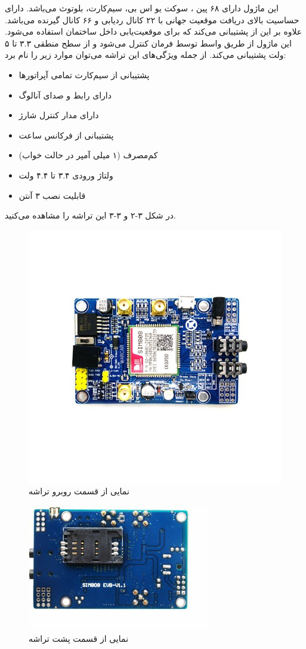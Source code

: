  
 این ماژول دارای ۶۸ پین ، سوکت یو اس بی، سیم‌کارت، بلوتوث می‌باشد. دارای حساسیت بالای دریافت موقعیت جهانی با ۲۲ کانال ردیابی و ۶۶ کانال گیرنده می‌باشد. علاوه بر این از  پشتیبانی می‌کند که برای موقعیت‌یابی داخل ساختمان استفاده می‌شود. این ماژول از طریق واسط  توسط فرمان  کنترل می‌شود و از سطح منطقی ۳.۳ تا ۵ ولت پشتیبانی می‌کند.
 از جمله ویژگی‌های این تراشه می‌توان موارد زیر را نام برد:
\begin{itemize}
	\item 
	پشتیبانی از سیم‌کارت تمامی آپراتورها
	\item
	دارای رابط  و صدای آنالوگ
	\item
	دارای مدار کنترل شارژ
	\item
	پشتیبانی از فرکانس ساعت
	\item
	کم‌مصرف (۱ میلی آمپر در حالت خواب)
	\item 
	ولتاژ ورودی ۳.۴ تا ۴.۴ ولت
	\item 
	قابلیت نصب ۳ آنتن 
\end{itemize} 
در شکل ۳-۲ و ۳-۳ این تراشه را مشاهده می‌کنید.
\begin{figure}[!h]
	\centerline{\includegraphics[width=.5\textwidth]{frontside-sim808}}
	\caption{نمایی از قسمت روبرو تراشه }
\end{figure}
\begin{figure}[!h]
	\centerline{\includegraphics[width=.5\textwidth]{backside-sim808}}
	\caption{نمایی از قسمت پشت تراشه }
\end{figure}

